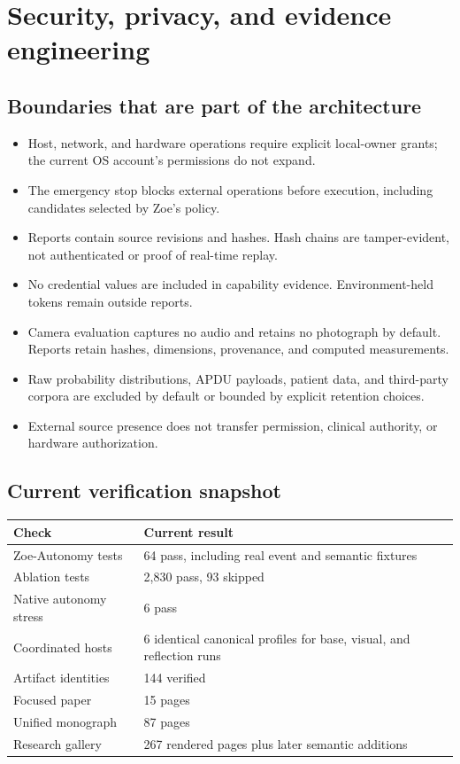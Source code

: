 \documentclass[11pt]{article}
\begin{document}
\clearpage
\section{Security, privacy, and evidence engineering}

\subsection{Boundaries that are part of the architecture}

\begin{itemize}
  \item Host, network, and hardware operations require explicit local-owner grants; the current OS account's permissions do not expand.
  \item The emergency stop blocks external operations before execution, including candidates selected by Zoe's policy.
  \item Reports contain source revisions and hashes. Hash chains are tamper-evident, not authenticated or proof of real-time replay.
  \item No credential values are included in capability evidence. Environment-held tokens remain outside reports.
  \item Camera evaluation captures no audio and retains no photograph by default. Reports retain hashes, dimensions, provenance, and computed measurements.
  \item Raw probability distributions, APDU payloads, patient data, and third-party corpora are excluded by default or bounded by explicit retention choices.
  \item External source presence does not transfer permission, clinical authority, or hardware authorization.
\end{itemize}

\subsection{Current verification snapshot}

\begin{center}
\begin{tabular}{ll}
\toprule
\textbf{Check} & \textbf{Current result}\\
\midrule
Zoe-Autonomy tests & 64 pass, including real event and semantic fixtures\\
Ablation tests & 2,830 pass, 93 skipped\\
Native autonomy stress & 6 pass\\
Coordinated hosts & 6 identical canonical profiles for base, visual, and reflection runs\\
Artifact identities & 144 verified\\
Focused paper & 15 pages\\
Unified monograph & 87 pages\\
Research gallery & 267 rendered pages plus later semantic additions\\
\bottomrule
\end{tabular}
\end{center}
\end{document}
